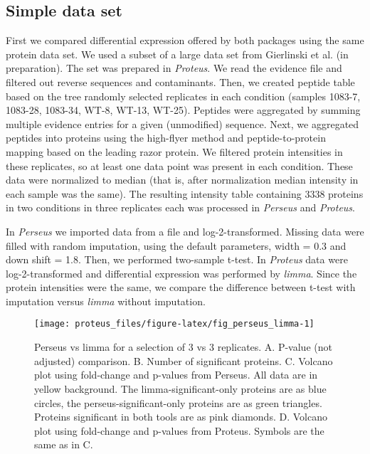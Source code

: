 \documentclass[]{article}
\begin{document}
\subsection{Simple data set}\label{simple-data-set}

First we compared differential expression offered by both packages using
the same protein data set. We used a subset of a large data set from
Gierlinski et al. (in preparation). The set was prepared in
\emph{Proteus}. We read the evidence file and filtered out reverse
sequences and contaminants. Then, we created peptide table based on the
tree randomly selected replicates in each condition (samples 1083-7,
1083-28, 1083-34, WT-8, WT-13, WT-25). Peptides were aggregated by
summing multiple evidence entries for a given (unmodified) sequence.
Next, we aggregated peptides into proteins using the high-flyer method
and peptide-to-protein mapping based on the leading razor protein. We
filtered protein intensities in these replicates, so at least one data
point was present in each condition. These data were normalized to
median (that is, after normalization median intensity in each sample was
the same). The resulting intensity table containing 3338 proteins in two
conditions in three replicates each was processed in \emph{Perseus} and
\emph{Proteus}.

In \emph{Perseus} we imported data from a file and log-2-transformed.
Missing data were filled with random imputation, using the default
parameters, width = 0.3 and down shift = 1.8. Then, we performed
two-sample t-test. In \emph{Proteus} data were log-2-transformed and
differential expression was performed by \emph{limma}. Since the protein
intensities were the same, we compare the difference between t-test with
imputation versus \emph{limma} without imputation.

\begin{figure}[H]

{\centering \texttt{[image: proteus\_files/figure-latex/fig\_perseus\_limma-1]} 

}

\caption{\label{fig:perseus_limma}Perseus vs limma for a selection of 3 vs 3 replicates. A. P-value (not adjusted) comparison. B. Number of significant proteins. C. Volcano plot using fold-change and p-values from Perseus. All data are in yellow background. The limma-significant-only proteins are as blue circles, the perseus-significant-only proteins are as green triangles. Proteins significant in both tools are as pink diamonds. D. Volcano plot using fold-change and p-values from Proteus. Symbols are the same as in C.}\label{fig:fig_perseus_limma}
\end{figure}
\end{document}
